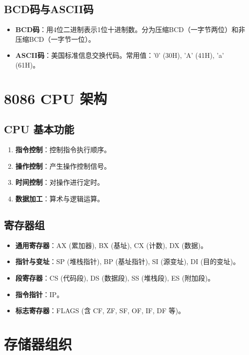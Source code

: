 \documentclass[12pt,a4paper]{ctexart}
\begin{document}
\subsection{BCD码与ASCII码}
\begin{itemize}
    \item \textbf{BCD码}：用4位二进制表示1位十进制数。分为压缩BCD（一字节两位）和非压缩BCD（一字节一位）。
    \item \textbf{ASCII码}：美国标准信息交换代码。常用值：'0' (30H), 'A' (41H), 'a' (61H)。
\end{itemize}

\section{8086 CPU 架构}

\subsection{CPU 基本功能}
\begin{enumerate}
    \item \textbf{指令控制}：控制指令执行顺序。
    \item \textbf{操作控制}：产生操作控制信号。
    \item \textbf{时间控制}：对操作进行定时。
    \item \textbf{数据加工}：算术与逻辑运算。
\end{enumerate}

\subsection{寄存器组}
\begin{itemize}
    \item \textbf{通用寄存器}：AX (累加器), BX (基址), CX (计数), DX (数据)。
    \item \textbf{指针与变址}：SP (堆栈指针), BP (基址指针), SI (源变址), DI (目的变址)。
    \item \textbf{段寄存器}：CS (代码段), DS (数据段), SS (堆栈段), ES (附加段)。
    \item \textbf{指令指针}：IP。
    \item \textbf{标志寄存器}：FLAGS (含 CF, ZF, SF, OF, IF, DF 等)。
\end{itemize}

\section{存储器组织}
\end{document}
